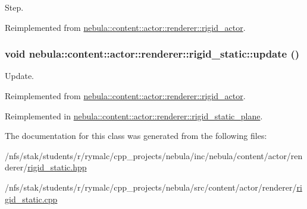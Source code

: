 Step. 

Reimplemented from \hyperlink{classnebula_1_1content_1_1actor_1_1renderer_1_1rigid__actor_a4e0cda8bb08115a62cbb8363ac439608}{nebula::content::actor::renderer::rigid\_\-actor}.\hypertarget{classnebula_1_1content_1_1actor_1_1renderer_1_1rigid__static_a3e3b767391a538db88e91035cca7c3dd}{
\subsubsection[{update}]{\setlength{\rightskip}{0pt plus 5cm}void nebula::content::actor::renderer::rigid\_\-static::update ()}}
\label{classnebula_1_1content_1_1actor_1_1renderer_1_1rigid__static_a3e3b767391a538db88e91035cca7c3dd}


Update. 

Reimplemented from \hyperlink{classnebula_1_1content_1_1actor_1_1renderer_1_1rigid__actor_a650ae9b6164016a9180817d7b077326f}{nebula::content::actor::renderer::rigid\_\-actor}.

Reimplemented in \hyperlink{classnebula_1_1content_1_1actor_1_1renderer_1_1rigid__static__plane_a3ef08d440181a74d4428ebef83607963}{nebula::content::actor::renderer::rigid\_\-static\_\-plane}.

The documentation for this class was generated from the following files:\begin{DoxyCompactItemize}
\item 
/nfs/stak/students/r/rymalc/cpp\_\-projects/nebula/inc/nebula/content/actor/renderer/\hyperlink{renderer_2rigid__static_8hpp}{rigid\_\-static.hpp}\item 
/nfs/stak/students/r/rymalc/cpp\_\-projects/nebula/src/content/actor/renderer/\hyperlink{renderer_2rigid__static_8cpp}{rigid\_\-static.cpp}\end{DoxyCompactItemize}
